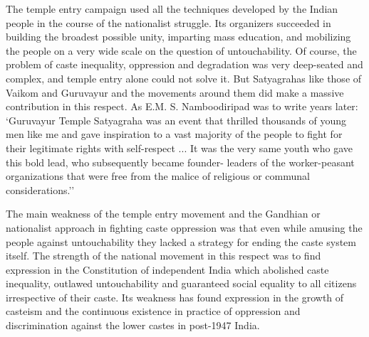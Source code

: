 \begin{multicols}{2}
The temple entry campaign used all the techniques developed by the Indian people in the course of the nationalist struggle. Its organizers succeeded in building the broadest possible unity, imparting mass education, and mobilizing the people on a very wide scale on the question of untouchability. Of course, the problem of caste inequality, oppression and degradation was very deep-seated and complex, and temple entry alone could not solve it. But Satyagrahas like those of Vaikom and Guruvayur and the movements around them did make a massive contribution in this respect. As E.M. S. Namboodiripad was to write years later: `Guruvayur Temple Satyagraha was an event that thrilled thousands of young men like me and gave inspiration to a vast majority of the people to fight for their legitimate rights with self-respect ... It was the very same youth who gave this bold lead, who subsequently became founder- leaders of the worker-peasant organizations that were free from the malice of religious or communal considerations.''

The main weakness of the temple entry movement and the Gandhian or nationalist approach in fighting caste oppression was that even while amusing the people against untouchability they lacked a strategy for ending the caste system itself. The strength of the national movement in this respect was to find expression in the Constitution of independent India which abolished caste inequality, outlawed untouchability and guaranteed social equality to all citizens irrespective of their caste. Its weakness has found expression in the growth of casteism and the continuous existence in practice of oppression and discrimination against the lower castes in post-1947 India.
\end{multicols}